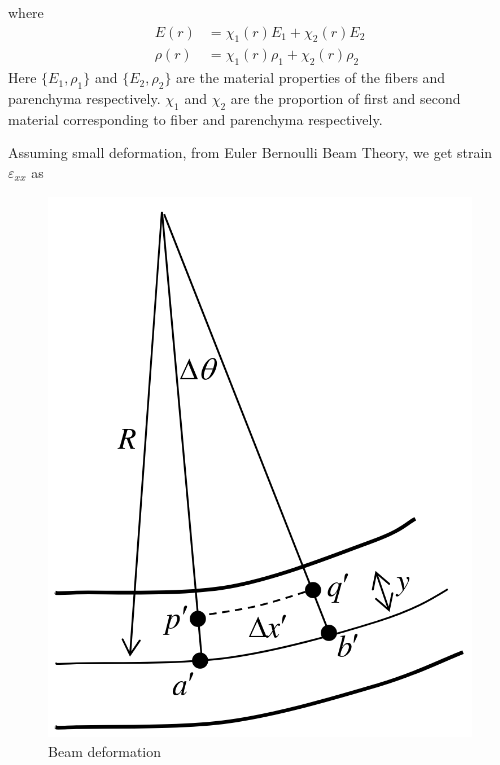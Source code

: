 \documentclass[10pt]{article}
\begin{document}
where 
\begin{equation}
\begin{split}
E(r) &= \chi_1(r) E_1 + \chi_2(r) E_2\\
\rho(r) &= \chi_1(r) \rho_1 + \chi_2(r) \rho_2
\end{split}
\end{equation}
Here $\{E_1, \rho_1\}$ and $\{E_2, \rho_2\}$ are the material properties of the fibers and parenchyma respectively. $\chi_1$ and $\chi_2$ are the proportion of first and second material corresponding to fiber and parenchyma respectively.\par
Assuming small deformation, from Euler Bernoulli Beam Theory, we get strain $\varepsilon_{xx}$ as\\
\begin{figure}
\begin{center}
\includegraphics[scale=0.15]{./Plots/normal/eb.png}
\caption{Beam deformation}
\end{center}
\end{figure}
\end{document}

